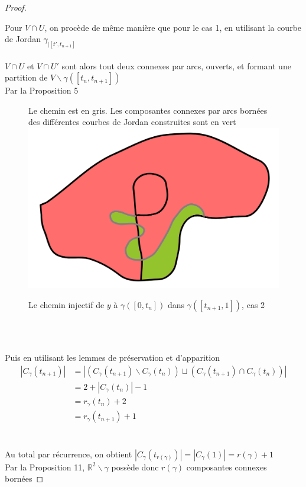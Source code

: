 \documentclass{article}
\begin{document}
\begin{flushleft}
\begin{proof}
\begin{itemize}
        Pour $V \cap U$, on procède de même manière que pour le cas 1, en utilisant la courbe de Jordan $\gamma_{\mid [t', t_{n+1}]}$
        \\~\\
        $V \cap U$ et $V \cap U'$ sont alors tout deux connexes par arcs, ouverts, et formant une partition de $V \backslash \gamma([t_n, t_{n+1}])$\\
        Par la Proposition 5
        \begin{figure}[h]
            \caption{Le chemin injectif de $y$ à $\gamma([0, t_n])$ dans $\gamma([t_{n+1}, 1])$, cas 2}
            \centering
            Le chemin est en gris.
            Les composantes connexes par arcs bornées des différentes courbes de Jordan construites sont en vert\\
            \includegraphics*[width = 0.5 \textwidth]{Unicité cas 2.png}
        \end{figure}
        \\~\\
    \end{itemize}
    Puis en utilisant les lemmes de préservation et d'apparition
    \begin{align*}
        |C_{\gamma}(t_{n+1})| &= |(C_{\gamma}(t_{n+1}) \backslash C_{\gamma}(t_n)) \sqcup (C_{\gamma}(t_{n+1}) \cap C_{\gamma}(t_n)) |\\
        &= 2 + |C_{\gamma}(t_n)| - 1\\
        &= r_{\gamma}(t_n) + 2\\
        &= r_{\gamma}(t_{n+1}) + 1
    \end{align*}
    \\~\\
    Au total par récurrence, on obtient $|C_{\gamma}(t_{r(\gamma)})| = |C_{\gamma}(1)| = r(\gamma) + 1$\\
    Par la Proposition 11, $\mathbb{R}^2 \backslash \gamma$ possède donc $r(\gamma)$ composantes connexes bornées

\end{proof}

\end{flushleft}
\end{document}
